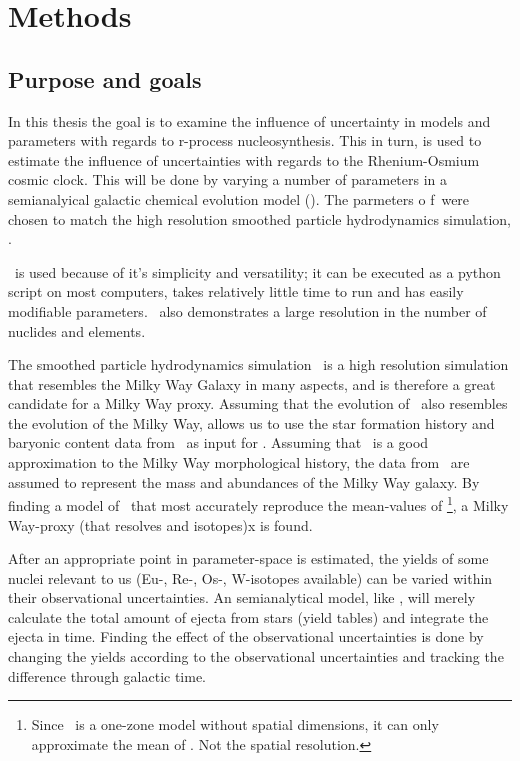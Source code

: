 \chapter{Methods}
\label{sec:methods}
\section{Purpose and goals}
In this thesis the goal is to examine the influence of uncertainty in models and parameters with regards to r-process nucleosynthesis.
This in turn, is used to estimate the influence of uncertainties with regards to the Rhenium-Osmium cosmic clock.
This will be done by varying a number of parameters in a semianalyical galactic chemical evolution model (\omegamodel).
The parmeters o f\omegamodel\ were chosen to match the high resolution smoothed particle hydrodynamics simulation, \eris.

\omegamodel\ is used because of it's simplicity and versatility;
it can be executed as a python script on most computers, takes relatively little time to run and has easily modifiable parameters.
\omegamodel\ also demonstrates a large resolution in the number of nuclides and elements.

The smoothed particle hydrodynamics simulation \eris\ is a high resolution simulation that resembles the Milky Way Galaxy in many aspects, and is therefore a great candidate for a Milky Way proxy.
Assuming that the evolution of \eris\ also resembles the evolution of the Milky Way, allows us to use the star formation history and baryonic content data from \eris\ as input for \omegamodel.
Assuming that \eris\ is a good approximation to the Milky Way morphological history, the data from \eris\ are assumed to represent the mass and abundances of the Milky Way galaxy.
By finding a model of \omegamodel\ that most accurately reproduce the mean-values of \eris\footnote{Since \omegamodel\ is a one-zone model without spatial dimensions, it can only approximate the mean of \eris. Not the spatial resolution.}, a Milky Way-proxy (that resolves  and  isotopes)x is found.

After an appropriate point in parameter-space is estimated, the yields of some nuclei relevant to us (Eu-, Re-, Os-, W-isotopes available) can be varied within their observational uncertainties.
An semianalytical model, like \omegamodel, will merely calculate the total amount of ejecta from stars (yield tables) and integrate the ejecta in time.
Finding the effect of the observational uncertainties is done by changing the yields according to the observational uncertainties and tracking the difference through galactic time.

